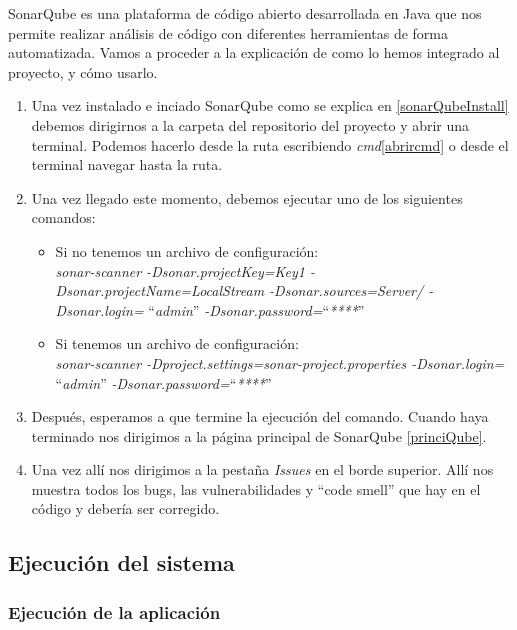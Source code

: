 SonarQube es una plataforma de código abierto desarrollada en Java que nos permite realizar análisis de código con diferentes herramientas de forma automatizada.
Vamos a proceder a la explicación de como lo hemos integrado al proyecto, y cómo usarlo.\\
\begin{enumerate}
\item
	Una vez instalado e inciado SonarQube como se explica en \ref{sonarQubeInstall} debemos dirigirnos a la carpeta del repositorio del proyecto y abrir una terminal. 
	Podemos hacerlo desde la ruta escribiendo \textit{cmd}\ref{abrircmd} o desde el terminal navegar hasta la ruta.
\label{abrircmd}
\item 
	Una vez llegado este momento, debemos ejecutar uno de los siguientes comandos:
	\begin{itemize}
	\item
		Si no tenemos un archivo de configuración:\\
		\textit{sonar-scanner -Dsonar.projectKey=Key1 -Dsonar.projectName=LocalStream -Dsonar.sources=Server/ -Dsonar.login=} ``\textit{admin}'' \textit{-Dsonar.password=}``\textit{****}''
	\item
	Si tenemos un archivo de configuración:\\
		\textit{sonar-scanner -Dproject.settings=sonar-project.properties -Dsonar.login=} ``\textit{admin}'' \textit{-Dsonar.password=}``\textit{****}''
	\end{itemize}
\item
	Después, esperamos a que termine la ejecución del comando. Cuando haya terminado nos dirigimos a la página principal de SonarQube \ref{princiQube}. 
\item
	Una vez allí nos dirigimos a la pestaña \textit{Issues} en el borde superior. Allí nos muestra todos los bugs, las vulnerabilidades y ``code smell'' que hay en el código y debería ser corregido. 
\end{enumerate}

\subsection{Ejecución del sistema}

\subsubsection{Ejecución de la aplicación}

